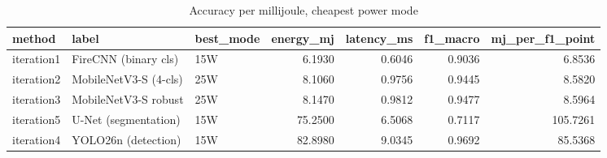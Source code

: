 \begin{table}
\caption{Accuracy per millijoule, cheapest power mode}
\begin{tabular}{lllrrrr}
\toprule
method & label & best\_mode & energy\_mj & latency\_ms & f1\_macro & mj\_per\_f1\_point \\
\midrule
iteration1 & FireCNN (binary cls) & 15W & 6.1930 & 0.6046 & 0.9036 & 6.8536 \\
iteration2 & MobileNetV3-S (4-cls) & 25W & 8.1060 & 0.9756 & 0.9445 & 8.5820 \\
iteration3 & MobileNetV3-S robust & 25W & 8.1470 & 0.9812 & 0.9477 & 8.5964 \\
iteration5 & U-Net (segmentation) & 15W & 75.2500 & 6.5068 & 0.7117 & 105.7261 \\
iteration4 & YOLO26n (detection) & 15W & 82.8980 & 9.0345 & 0.9692 & 85.5368 \\
\bottomrule
\end{tabular}
\end{table}
